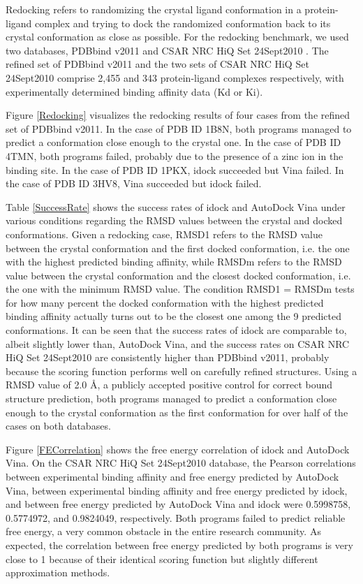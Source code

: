 \documentclass[12pt]{article}
\begin{document}
Redocking refers to randomizing the crystal ligand conformation in a protein-ligand complex and trying to dock the randomized conformation back to its crystal conformation as close as possible. For the redocking benchmark, we used two databases, PDBbind v2011 \citep{529,530} and CSAR NRC HiQ Set 24Sept2010 \citep{857,960}. The refined set of PDBbind v2011 and the two sets of CSAR NRC HiQ Set 24Sept2010 comprise 2,455 and 343 protein-ligand complexes respectively, with experimentally determined binding affinity data (Kd or Ki).

Figure \ref{Redocking} visualizes the redocking results of four cases from the refined set of PDBbind v2011. In the case of PDB ID 1B8N, both programs managed to predict a conformation close enough to the crystal one. In the case of PDB ID 4TMN, both programs failed, probably due to the presence of a zinc ion in the binding site. In the case of PDB ID 1PKX, idock succeeded but Vina failed. In the case of PDB ID 3HV8, Vina succeeded but idock failed.

Table \ref{SuccessRate} shows the success rates of idock and AutoDock Vina under various conditions regarding the RMSD values between the crystal and docked conformations. Given a redocking case, RMSD1 refers to the RMSD value between the crystal conformation and the first docked conformation, i.e. the one with the highest predicted binding affinity, while RMSDm refers to the RMSD value between the crystal conformation and the closest docked conformation, i.e. the one with the minimum RMSD value. The condition RMSD1 = RMSDm tests for how many percent the docked conformation with the highest predicted binding affinity actually turns out to be the closest one among the 9 predicted conformations. It can be seen that the success rates of idock are comparable to, albeit slightly lower than, AutoDock Vina, and the success rates on CSAR NRC HiQ Set 24Sept2010 are consistently higher than PDBbind v2011, probably because the scoring function performs well on carefully refined structures. Using a RMSD value of 2.0 \AA, a publicly accepted positive control for correct bound structure prediction, both programs managed to predict a conformation close enough to the crystal conformation as the first conformation for over half of the cases on both databases.

Figure \ref{FECorrelation} shows the free energy correlation of idock and AutoDock Vina. On the CSAR NRC HiQ Set 24Sept2010 database, the Pearson correlations between experimental binding affinity and free energy predicted by AutoDock Vina, between experimental binding affinity and free energy predicted by idock, and between free energy predicted by AutoDock Vina and idock were 0.5998758, 0.5774972, and 0.9824049, respectively. Both programs failed to predict reliable free energy, a very common obstacle in the entire research community. As expected, the correlation between free energy predicted by both programs is very close to 1 because of their identical scoring function but slightly different approximation methods.
\end{document}
